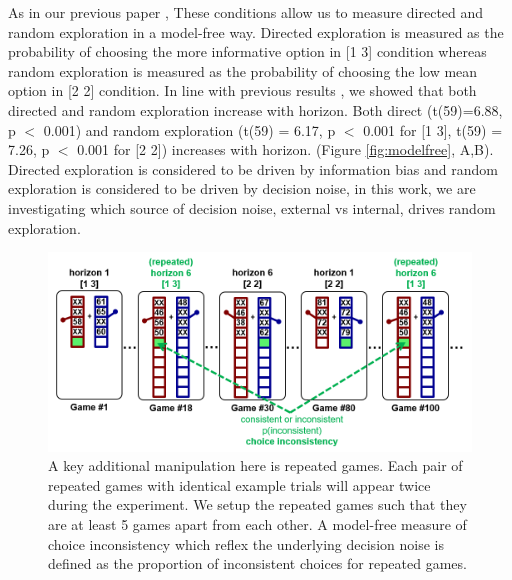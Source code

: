 \documentclass[12pt]{article}
\begin{document}
	As in our previous paper \citep{wilson2014}, These conditions allow us to measure directed and random exploration in a model-free way. Directed exploration is measured as the probability of choosing the more informative option in [1 3] condition whereas random exploration is measured as the probability of choosing the low mean option in [2 2] condition. In line with previous results \citep{wilson2014}, we showed that both directed and random exploration increase with horizon. Both direct (t(59)=6.88, p $<$ 0.001) and random exploration (t(59) = 6.17, p $<$ 0.001 for [1 3], t(59) = 7.26, p $<$ 0.001 for [2 2]) increases with horizon. (Figure \ref{fig:modelfree}, A,B).   Directed exploration is considered to be driven by information bias and random exploration is considered to be driven by decision noise, in this work, we are investigating which source of decision noise, external vs internal, drives random exploration.
	
	
	
	\begin{figure}[H]
		\begin{center}
			\includegraphics[width=\textwidth]{figures/taskfig.PNG}
			\caption{A key additional manipulation here is repeated games. Each pair of repeated games with identical example trials will appear twice during the experiment. We setup the repeated games such that they are at least 5 games apart from each other. A model-free measure of choice inconsistency which reflex the underlying decision noise is defined as the proportion of inconsistent choices for repeated games.}
			\label{fig:taskfig}
		\end{center}
	\end{figure}
	
\end{document}
